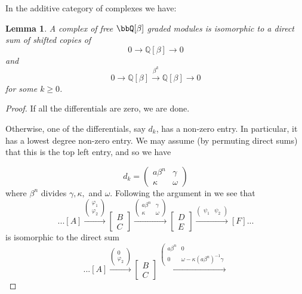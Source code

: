 \documentclass{amsart}
\theoremstyle{plain}
\newtheorem{lem}[prop]{Lemma}
\newcommand{\complexzero}{0\rightarrow\mathbb Q [\beta]\rightarrow 0}
\newcommand{\complexk}[1]{0\rightarrow\mathbb Q [\beta]\xrightarrow{\beta^{#1}}{}\mathbb Q [\beta]\rightarrow 0}
\begin{document}
In the additive category of complexes we have:

\begin{lem}
A complex of free $\bbQ[\beta]$ graded modules is isomorphic to a direct sum of shifted copies of
\[
\complexzero
\]
and
\[
\complexk{k}
\]
for some $k \geq 0$.

\end{lem}
\begin{proof}
If all the differentials are zero, we are done.

Otherwise, one of the differentials, say $d_k$, has a non-zero entry. In particular, it has a lowest degree non-zero entry. We may assume (by permuting direct sums) that this is the top left entry, and so we have

\[
d_k=\left(
\begin{array}{c|c}
a\beta^n&\gamma\\ \hline
\kappa &\omega
\end{array}
\right)
\]
where $\beta^n$ divides $\gamma,\kappa,$ and $\omega$.
Following the argument in \cite[Lemma 4.2]{math.GT/0606318} 
we see that 
\[
...[A]
\xrightarrow{\left(\begin{array}{c}\varphi_1 \\ \varphi_2\end{array}\right)}
\left[\begin{array}{c}B \\ C\end{array}\right]
\xrightarrow{\left(
\begin{array}{cc}
a\beta^n&\gamma\\
\kappa &\omega
\end{array}
\right)}
\left[\begin{array}{c}D \\ E\end{array}\right]
\xrightarrow{\left(\begin{array}{cc}\psi_1 & \psi_2\end{array}\right)}
[F]...
\]
is isomorphic to the direct sum 
\[
...[A]
\xrightarrow{\left(\begin{array}{c}0 \\ \varphi_2\end{array}\right)}
\left[\begin{array}{c}B \\ C\end{array}\right]
\xrightarrow{\left(
\begin{array}{cc}
a\beta^n&0\\
0 &\omega-\kappa (a\beta^{n})^{-1} \gamma

\end{array}}\]
\end{proof}
\end{document}

